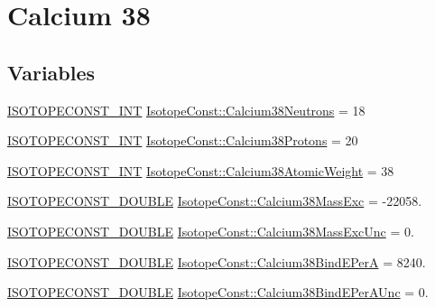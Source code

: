 \hypertarget{group___isotope_const-_calcium-_ca38}{}\section{Calcium 38}
\label{group___isotope_const-_calcium-_ca38}
\subsection*{Variables}
\begin{DoxyCompactItemize}
\item 
\mbox{\hyperlink{group___isotope_const-_macros_ga5f18360b3e99483a35c32d789e62621c}{I\+S\+O\+T\+O\+P\+E\+C\+O\+N\+S\+T\+\_\+\+I\+NT}} \mbox{\hyperlink{group___isotope_const-_calcium-_ca38_ga64e12259008c5f41a95a16ccf7b73810}{Isotope\+Const\+::\+Calcium38\+Neutrons}} = 18
\item 
\mbox{\hyperlink{group___isotope_const-_macros_ga5f18360b3e99483a35c32d789e62621c}{I\+S\+O\+T\+O\+P\+E\+C\+O\+N\+S\+T\+\_\+\+I\+NT}} \mbox{\hyperlink{group___isotope_const-_calcium-_ca38_ga34d45151075e5ac1a36426f5cdd66161}{Isotope\+Const\+::\+Calcium38\+Protons}} = 20
\item 
\mbox{\hyperlink{group___isotope_const-_macros_ga5f18360b3e99483a35c32d789e62621c}{I\+S\+O\+T\+O\+P\+E\+C\+O\+N\+S\+T\+\_\+\+I\+NT}} \mbox{\hyperlink{group___isotope_const-_calcium-_ca38_ga194d9fbd5e2575b1aede62ac6f956044}{Isotope\+Const\+::\+Calcium38\+Atomic\+Weight}} = 38
\item 
\mbox{\hyperlink{group___isotope_const-_macros_ga8f45a7272ce02c0b4c65c44636ed719a}{I\+S\+O\+T\+O\+P\+E\+C\+O\+N\+S\+T\+\_\+\+D\+O\+U\+B\+LE}} \mbox{\hyperlink{group___isotope_const-_calcium-_ca38_ga220568a094739319b23d97f759be3ecb}{Isotope\+Const\+::\+Calcium38\+Mass\+Exc}} = -\/22058.
\item 
\mbox{\hyperlink{group___isotope_const-_macros_ga8f45a7272ce02c0b4c65c44636ed719a}{I\+S\+O\+T\+O\+P\+E\+C\+O\+N\+S\+T\+\_\+\+D\+O\+U\+B\+LE}} \mbox{\hyperlink{group___isotope_const-_calcium-_ca38_gae70e570e4c2e6174da2d599e21195563}{Isotope\+Const\+::\+Calcium38\+Mass\+Exc\+Unc}} = 0.
\item 
\mbox{\hyperlink{group___isotope_const-_macros_ga8f45a7272ce02c0b4c65c44636ed719a}{I\+S\+O\+T\+O\+P\+E\+C\+O\+N\+S\+T\+\_\+\+D\+O\+U\+B\+LE}} \mbox{\hyperlink{group___isotope_const-_calcium-_ca38_gad2ab6423ce1a6e63fa08a3702771e65a}{Isotope\+Const\+::\+Calcium38\+Bind\+E\+PerA}} = 8240.
\item 
\mbox{\hyperlink{group___isotope_const-_macros_ga8f45a7272ce02c0b4c65c44636ed719a}{I\+S\+O\+T\+O\+P\+E\+C\+O\+N\+S\+T\+\_\+\+D\+O\+U\+B\+LE}} \mbox{\hyperlink{group___isotope_const-_calcium-_ca38_ga4e5a277534ad01f925854345b1f3754f}{Isotope\+Const\+::\+Calcium38\+Bind\+E\+Per\+A\+Unc}} = 0.

\end{DoxyCompactItemize}
